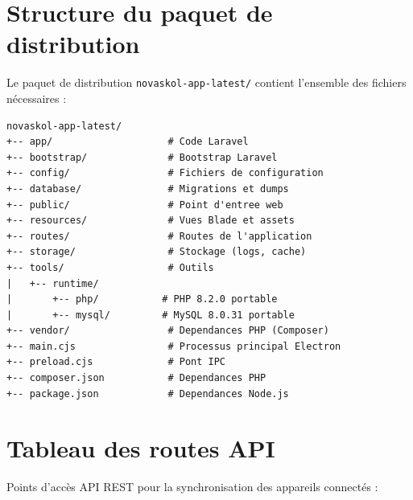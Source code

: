 \documentclass[12pt,a4paper,twoside]{report}
\begin{document}
\chapter{Structure du paquet de distribution}

Le paquet de distribution \texttt{novaskol-app-latest/} contient l'ensemble des fichiers nécessaires :

\begin{verbatim}
novaskol-app-latest/
+-- app/                    # Code Laravel
+-- bootstrap/              # Bootstrap Laravel
+-- config/                 # Fichiers de configuration
+-- database/               # Migrations et dumps
+-- public/                 # Point d'entree web
+-- resources/              # Vues Blade et assets
+-- routes/                 # Routes de l'application
+-- storage/                # Stockage (logs, cache)
+-- tools/                  # Outils
|   +-- runtime/
|       +-- php/           # PHP 8.2.0 portable
|       +-- mysql/         # MySQL 8.0.31 portable
+-- vendor/                 # Dependances PHP (Composer)
+-- main.cjs                # Processus principal Electron
+-- preload.cjs             # Pont IPC
+-- composer.json           # Dependances PHP
+-- package.json            # Dependances Node.js
\end{verbatim}

\chapter{Tableau des routes API}

Points d'accès API REST pour la synchronisation des appareils connectés :
\end{document}
